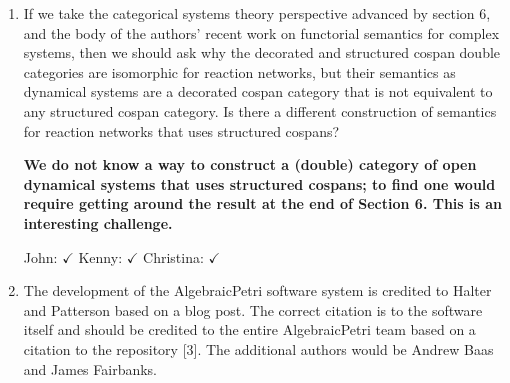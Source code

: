 \documentclass[reqno]{amsart}
\def\chris{\color{purple} Christina: }
\def\john{\color{red} John: }
\def\kenny{\color{blue} Kenny: }
\begin{document}
\begin{enumerate}
\item If we take the categorical systems theory perspective advanced by section 6, and the body of the authors’ recent work on functorial semantics 
for complex 
systems, then we should ask why the decorated and structured cospan double categories are isomorphic for reaction networks, but their semantics as 
dynamical systems are a decorated cospan category that is not equivalent to any structured cospan category. Is there a different construction of 
semantics for reaction networks that uses structured cospans?

{\bf We do not know a way to construct a (double) category of open dynamical systems that uses structured cospans; to find one would require getting around the result at the end of Section 6.  This is an interesting challenge.}

{\john $\checkmark$} {\kenny $\checkmark$} {\chris $\checkmark$}

\iffalse
{\chris Should we refer to which result we are talking about? Also, I am a bit confused about the question and answer. I thought reaction networks 
can be described in both ways?}

{\kenny I'm kinda' confused by the question, too, due to its wording. Based on what Dr. Baez said in response, I think they might have meant dynamical systems instead of reaction networks in their last sentence. They even say earlier in their comment that the frameworks are isomorphic for reaction networks.}

{\john The referee was asking about the \emph{semantics} for reaction networks --- that is, dynamical systems!  Reaction networks are the ``syntax'' and dynamical systems are our chosen ``semantics'' for these.  But my reply in boldface was confused --- you're right.  So I've fixed it. 
The ``result at the end of Section 6'' is the one where we show the functor from dynamical systems to finite sets doesn't have a left adjoint.  For 
some reason we didn't make this into a theorem.   Give me a check mark if you're happy now.   }

{\chris I see, thanks!}
\fi

\item The development of the AlgebraicPetri software system is credited to Halter and Patterson based on a blog post. The correct citation is to the 
software itself and should be credited to the entire AlgebraicPetri team based on a citation to the repository [3]. The additional authors would be 
Andrew Baas and James Fairbanks.


\end{enumerate}
\end{document}
